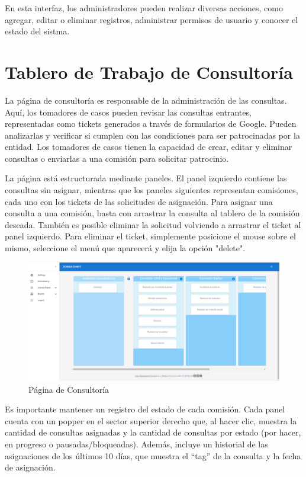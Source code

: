 En esta interfaz, los administradores pueden realizar diversas acciones, como agregar, editar o eliminar registros, administrar permisos de usuario y conocer el estado del sistma.



\section{Tablero de Trabajo de Consultoría}
La página de consultoría es responsable de la administración de las consultas. Aquí, los tomadores de casos pueden revisar las consultas entrantes, representadas como tickets generados a través de formularios de Google. Pueden analizarlas y verificar si cumplen con las condiciones para ser patrocinadas por la entidad. Los tomadores de casos tienen la capacidad de crear, editar y eliminar consultas o enviarlas a una comisión para solicitar patrocinio.

La página está estructurada mediante paneles. El panel izquierdo contiene las consultas sin asignar, mientras que los paneles siguientes representan comisiones, cada uno con los tickets de las solicitudes de asignación. Para asignar una consulta a una comisión, basta con arrastrar la consulta al tablero de la comisión deseada. También es posible eliminar la solicitud volviendo a arrastrar el ticket al panel izquierdo. Para eliminar el ticket, simplemente posicione el mouse sobre el mismo, seleccione el menú que aparecerá y elija la opción "delete".

\begin{figure}[H]
    \centering
    \includegraphics[width=1\linewidth]{fig/consultancy-real-page.png}
    \caption{Página de Consultoría}
    \label{fig:consultancy-real-page}
\end{figure}

Es importante mantener un registro del estado de cada comisión. Cada panel cuenta con un popper en el sector superior derecho que, al hacer clic, muestra la cantidad de consultas asignadas y la cantidad de consultas por estado (por hacer, en progreso o pausadas/bloqueadas). Además, incluye un historial de las asignaciones de los últimos 10 días, que muestra el ``tag'' de la consulta y la fecha de asignación.

